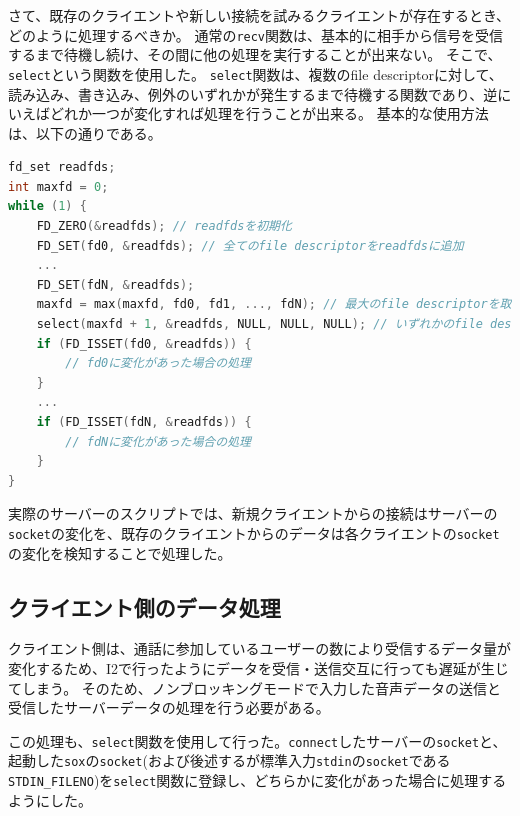 \documentclass[a4paper]{ltjsarticle}
\begin{document}
さて、既存のクライエントや新しい接続を試みるクライエントが存在するとき、どのように処理するべきか。
通常の\verb|recv|関数は、基本的に相手から信号を受信するまで待機し続け、その間に他の処理を実行することが出来ない。
そこで、\verb|select|という関数を使用した。
\verb|select|関数は、複数のfile descriptorに対して、読み込み、書き込み、例外のいずれかが発生するまで待機する関数であり、逆にいえばどれか一つが変化すれば処理を行うことが出来る。
基本的な使用方法は、以下の通りである。
\begin{lstlisting}[language=C]
fd_set readfds;
int maxfd = 0;
while (1) {
    FD_ZERO(&readfds); // readfdsを初期化
    FD_SET(fd0, &readfds); // 全てのfile descriptorをreadfdsに追加
    ...
    FD_SET(fdN, &readfds);
    maxfd = max(maxfd, fd0, fd1, ..., fdN); // 最大のfile descriptorを取得
    select(maxfd + 1, &readfds, NULL, NULL, NULL); // いずれかのfile descriptorが変化するまで待機
    if (FD_ISSET(fd0, &readfds)) {
        // fd0に変化があった場合の処理
    }
    ...
    if (FD_ISSET(fdN, &readfds)) {
        // fdNに変化があった場合の処理
    }
}
\end{lstlisting}
実際のサーバーのスクリプトでは、新規クライエントからの接続はサーバーの\verb|socket|の変化を、既存のクライエントからのデータは各クライエントの\verb|socket|の変化を検知することで処理した。

\subsection{クライエント側のデータ処理}
クライエント側は、通話に参加しているユーザーの数により受信するデータ量が変化するため、I2で行ったようにデータを受信・送信交互に行っても遅延が生じてしまう。
そのため、ノンブロッキングモードで入力した音声データの送信と受信したサーバーデータの処理を行う必要がある。

この処理も、\verb|select|関数を使用して行った。\verb|connect|したサーバーの\verb|socket|と、起動した\verb|sox|の\verb|socket|(および後述するが標準入力\verb|stdin|の\verb|socket|である\verb|STDIN_FILENO|)を\verb|select|関数に登録し、どちらかに変化があった場合に処理するようにした。
\end{document}

